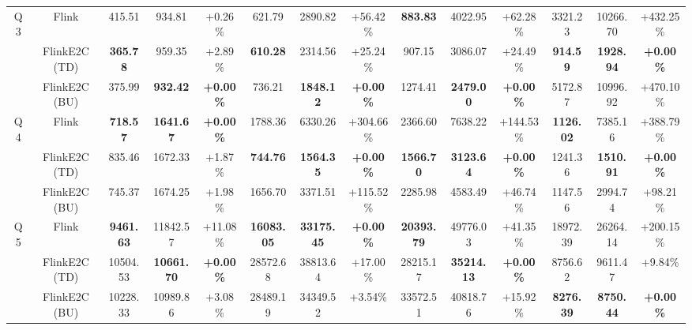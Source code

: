 \begin{tabular}{@{} c c c c c c c c c c c c c c @{}}
  \cmidrule(lr){1-14}
  \multirow{3}{*}{Q3} & Flink & \num{415.51} & \num{934.81} & +\num{0.26}\% & \num{621.79} & \num{2890.82} & +\num{56.42}\% & {\bfseries \num{883.83}} & \num{4022.95} & +\num{62.28}\% & \num{3321.23} & \num{10266.70} & +\num{432.25}\% \\
   & FlinkE2C (TD) & {\bfseries \num{365.78}} & \num{959.35} & +\num{2.89}\% & {\bfseries \num{610.28}} & \num{2314.56} & +\num{25.24}\% & \num{907.15} & \num{3086.07} & +\num{24.49}\% & {\bfseries \num{914.59}} & {\bfseries \num{1928.94}} & {\bfseries +\num{0.00}\%} \\
   & FlinkE2C (BU) & \num{375.99} & {\bfseries \num{932.42}} & {\bfseries +\num{0.00}\%} & \num{736.21} & {\bfseries \num{1848.12}} & {\bfseries +\num{0.00}\%} & \num{1274.41} & {\bfseries \num{2479.00}} & {\bfseries +\num{0.00}\%} & \num{5172.87} & \num{10996.92} & +\num{470.10}\% \\
  \cmidrule(lr){1-14}
  \multirow{3}{*}{Q4} & Flink & {\bfseries \num{718.57}} & {\bfseries \num{1641.67}} & {\bfseries +\num{0.00}\%} & \num{1788.36} & \num{6330.26} & +\num{304.66}\% & \num{2366.60} & \num{7638.22} & +\num{144.53}\% & {\bfseries \num{1126.02}} & \num{7385.16} & +\num{388.79}\% \\
   & FlinkE2C (TD) & \num{835.46} & \num{1672.33} & +\num{1.87}\% & {\bfseries \num{744.76}} & {\bfseries \num{1564.35}} & {\bfseries +\num{0.00}\%} & {\bfseries \num{1566.70}} & {\bfseries \num{3123.64}} & {\bfseries +\num{0.00}\%} & \num{1241.36} & {\bfseries \num{1510.91}} & {\bfseries +\num{0.00}\%} \\
   & FlinkE2C (BU) & \num{745.37} & \num{1674.25} & +\num{1.98}\% & \num{1656.70} & \num{3371.51} & +\num{115.52}\% & \num{2285.98} & \num{4583.49} & +\num{46.74}\% & \num{1147.56} & \num{2994.74} & +\num{98.21}\% \\
  \cmidrule(lr){1-14}
  \multirow{3}{*}{Q5} & Flink & {\bfseries \num{9461.63}} & \num{11842.57} & +\num{11.08}\% & {\bfseries \num{16083.05}} & {\bfseries \num{33175.45}} & {\bfseries +\num{0.00}\%} & {\bfseries \num{20393.79}} & \num{49776.03} & +\num{41.35}\% & \num{18972.39} & \num{26264.14} & +\num{200.15}\% \\
   & FlinkE2C (TD) & \num{10504.53} & {\bfseries \num{10661.70}} & {\bfseries +\num{0.00}\%} & \num{28572.68} & \num{38813.64} & +\num{17.00}\% & \num{28215.17} & {\bfseries \num{35214.13}} & {\bfseries +\num{0.00}\%} & \num{8756.62} & \num{9611.47} & +\num{9.84}\% \\
   & FlinkE2C (BU) & \num{10228.33} & \num{10989.86} & +\num{3.08}\% & \num{28489.19} & \num{34349.52} & +\num{3.54}\% & \num{33572.51} & \num{40818.76} & +\num{15.92}\% & {\bfseries \num{8276.39}} & {\bfseries \num{8750.44}} & {\bfseries +\num{0.00}\%} \\

\end{tabular}
